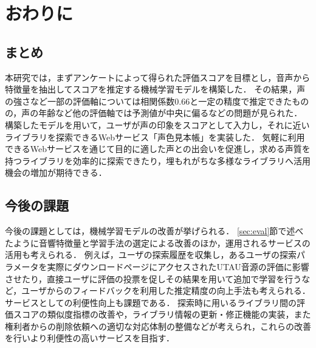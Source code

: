 \chapter{おわりに}
\thispagestyle{myheadings}

\section{まとめ}
本研究では，まずアンケートによって得られた評価スコアを目標とし，音声から特徴量を抽出してスコアを推定する機械学習モデルを構築した．
その結果，声の強さなど一部の評価軸については相関係数0.66と一定の精度で推定できたものの，声の年齢など他の評価軸では予測値が中央に偏るなどの問題が見られた．
構築したモデルを用いて，ユーザが声の印象をスコアとして入力し，それに近いライブラリを探索できるWebサービス「声色見本帳」を実装した．
気軽に利用できるWebサービスを通じて目的に適した声との出会いを促進し，求める声質を持つライブラリを効率的に探索できたり，埋もれがちな多様なライブラリへ活用機会の増加が期待できる．

\section{今後の課題}
今後の課題としては，機械学習モデルの改善が挙げられる．
\ref{sec:eval}節で述べたように音響特徴量と学習手法の選定による改善のほか，運用されるサービスの活用も考えられる．
例えば，ユーザの探索履歴を収集し，あるユーザの探索パラメータを実際にダウンロードページにアクセスされたUTAU音源の評価に影響させたり，直接ユーザに評価の投票を促しその結果を用いて追加で学習を行うなど，ユーザからのフィードバックを利用した推定精度の向上手法も考えられる．
サービスとしての利便性向上も課題である．
探索時に用いるライブラリ間の評価スコアの類似度指標の改善や，ライブラリ情報の更新・修正機能の実装，また権利者からの削除依頼への適切な対応体制の整備などが考えられ，これらの改善を行いより利便性の高いサービスを目指す．

